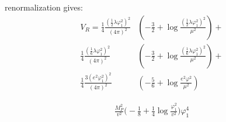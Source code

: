 \MSbar renormalization gives:
\begin{align}
V_R=\frac{1}{4}\frac{(\frac{1}{2}\lambda\varphi_1^2)^2}{(4\pi)^2}&\left(-\frac{3}{2}+ 
\log{\frac{(\frac{1}{2}\lambda\varphi_1^2)^2}{\mu^2}}\right) + \\
\frac{1}{4}\frac{(\frac{1}{6}\lambda\varphi_1^2)^2}{(4\pi)^2}&\left(-\frac{3}{2}+ 
\log{\frac{(\frac{1}{6}\lambda\varphi_1^2)^2}{\mu^2}}\right) + \\
\frac{1}{4}\frac{3(e^2\varphi_1^2)^2}{(4\pi)^2}&\left(-\frac{5}{6}+
\log{\frac{e^2\varphi^2}{\mu^2}}\right)
\end{align}

\begin{align}
\frac{M_P^2}{v^2}\Big(-\frac{1}{8}+\frac{1}{4}\log\frac{\varphi_1^2}{v^2}\Big)\varphi_1^4
\end{align}
